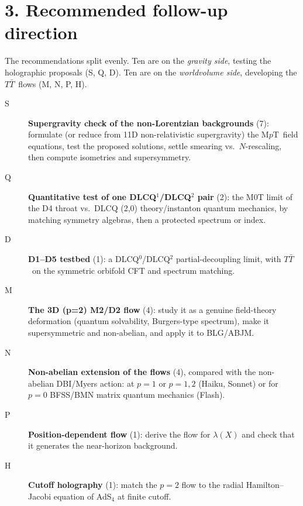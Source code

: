 \documentclass[11pt,a4paper]{article}
\newcommand{\MpT}{M$p$T}
\newcommand{\TTbar}{$T\bar T$}
\begin{document}
\clearpage
\section*{3. Recommended follow-up direction}
The recommendations split evenly. Ten are on the \emph{gravity side}, testing the holographic proposals (S, Q, D). Ten are on the \emph{worldvolume side}, developing the \TTbar\ flows (M, N, P, H).
\begin{description}
\item[S] \textbf{Supergravity check of the non-Lorentzian backgrounds} (7): formulate (or reduce from 11D non-relativistic supergravity) the \MpT\ field equations, test the proposed solutions, settle smearing vs.\ $N$-rescaling, then compute isometries and supersymmetry.
\item[Q] \textbf{Quantitative test of one DLCQ$^1$/DLCQ$^2$ pair} (2): the M0T limit of the D4 throat vs.\ DLCQ (2,0) theory/instanton quantum mechanics, by matching symmetry algebras, then a protected spectrum or index.
\item[D] \textbf{D1--D5 testbed} (1): a DLCQ$^0$/DLCQ$^2$ partial-decoupling limit, with \TTbar\ on the symmetric orbifold CFT and spectrum matching.
\item[M] \textbf{The 3D (p=2) M2/D2 flow} (4): study it as a genuine field-theory deformation (quantum solvability, Burgers-type spectrum), make it supersymmetric and non-abelian, and apply it to BLG/ABJM.
\item[N] \textbf{Non-abelian extension of the flows} (4), compared with the non-abelian DBI/Myers action: at $p=1$ or $p=1,2$ (Haiku, Sonnet) or for $p=0$ BFSS/BMN matrix quantum mechanics (Flash).
\item[P] \textbf{Position-dependent flow} (1): derive the flow for $\lambda(X)$ and check that it generates the near-horizon background.
\item[H] \textbf{Cutoff holography} (1): match the $p=2$ flow to the radial Hamilton--Jacobi equation of AdS$_4$ at finite cutoff.
\end{description}
\end{document}
